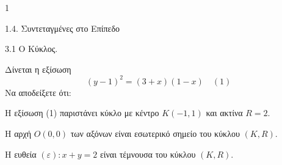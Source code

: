 \begin{ylh}{1}
    \item 1.4. Συντεταγμένες στο Επίπεδο
    \item 3.1 Ο Κύκλος.
\end{ylh}
Δίνεται η εξίσωση
\[ (y - 1)^2 = (3 + x)(1 - x) \quad (1) \]
Να αποδείξετε ότι:
\begin{alist}
    \item Η εξίσωση (1) παριστάνει κύκλο με κέντρο $K(-1,1)$ και ακτίνα $R = 2$. 
    \item Η αρχή $O(0,0)$ των αξόνων είναι εσωτερικό σημείο του κύκλου $(K,R)$. 
    \item Η ευθεία $(\varepsilon): x + y = 2$ είναι τέμνουσα του κύκλου $(K,R)$. 
\end{alist}